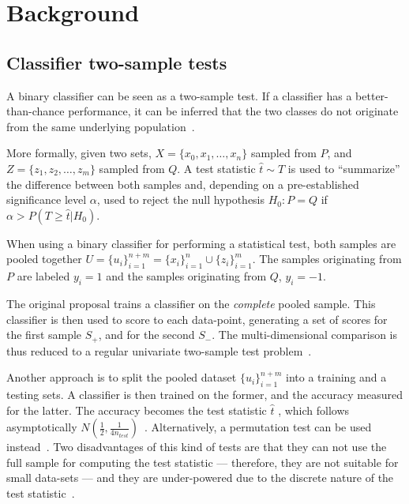 \section{Background}
\label{sec:som_background}

\subsection{Classifier two-sample tests}
\label{sec:som_classifier2sample}
A binary classifier can be seen as a two-sample test. If a classifier has a better-than-chance
performance, it can be inferred that the two classes do not originate from the same underlying
population~\cite{friedman2004multivariate}. 

More formally, given two sets, $X = \{x_0,x_1,\ldots,x_n\}$ sampled from $P$, and \linebreak
$Z = \{z_1,z_2,\ldots,z_m\}$ sampled from $Q$. A test statistic $\hat t \sim T$ is
used to ``summarize'' the difference between both samples and, depending on a pre-established
significance level $\alpha$, used to reject the null hypothesis $H_0: P = Q$ if
$\alpha > P(T \ge \hat t | H_0)$.

When using a binary classifier for performing a statistical test, both samples
are pooled together $U = \{u_i\}_{i=1}^{n+m} = \{x_i\}_{i=1}^n \cup \{z_i\}_{i=1}^m$.
The samples originating from $P$ are labeled $y_i=1$ and the samples originating from $Q$, $y_i=-1$.

The original proposal trains a classifier on the \emph{complete} pooled sample.
This classifier is then used to score to each data-point, generating a set of scores
for the first sample $S_+$, and for the second $S_-$. The multi-dimensional comparison is thus
reduced to a regular univariate two-sample test problem~\cite{friedman2004multivariate}.

Another approach is to split the pooled dataset $\{u_i\}_{i=1}^{n+m}$ into a training and
a testing sets. A classifier is then trained on the former, and the accuracy measured
for the latter. The accuracy becomes the test statistic $\hat t$ ,
which follows asymptotically $N(\frac{1}{2}, \frac{1}{4 n_{test}})$~\cite{lopez2016revisiting}. Alternatively, a permutation test can be used instead~\cite{kim2021classification}.
Two disadvantages of this kind of tests are that they can not use the full sample for computing
the test statistic --- therefore, they are not suitable for small data-sets ---
and they are under-powered due to the discrete nature of the test statistic~\cite{rosenblatt2021better}.


